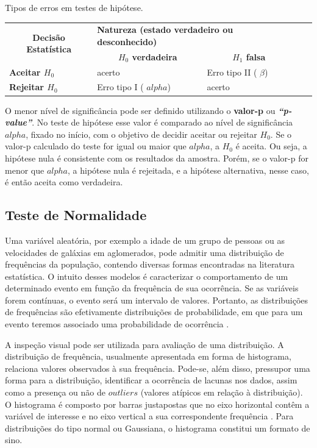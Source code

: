 \begin{quadro}[!htb]
	\centering
	\caption{Tipos de erros em testes de hipótese.\label{qua:hipotese}}
	\begin{tabular}{|l|l|l|ll}
		\cline{1-3}
\multicolumn{1}{|c|}{\multirow{2}{*}{\textbf{Decisão Estatística}}} & \multicolumn{2}{l|}{\textbf{Natureza (estado verdadeiro ou desconhecido)}} &  &  \\ \cline{2-3}
\multicolumn{1}{|c|}{} & \multicolumn{1}{c|}{\textbf{$H_0$ verdadeira}} & \multicolumn{1}{c|}{\textbf{$H_1$ falsa}} &  &  \\ \cline{1-3}
\textbf{Aceitar $H_0$} & acerto & Erro tipo II ( \ensuremath{\beta}) &  &  \\ \cline{1-3}
\textbf{Rejeitar $H_0$} & Erro tipo I ( \ensuremath{alpha}) & acerto &  &  \\ \cline{1-3}
	\end{tabular}
	\textbf{}
\end{quadro}

O menor nível de significância pode ser definido utilizando o \textbf{valor-p} ou \textbf{\textit{“p-value”}}. No teste de hipótese esse valor é comparado ao nível de significância \ensuremath{alpha}, fixado no início, com o objetivo de decidir aceitar ou rejeitar $H_0$. Se o valor-p calculado do teste for igual ou maior que \ensuremath{alpha}, a $H_0$ é aceita. Ou seja, a hipótese nula é consistente com os resultados da amostra. Porém, se o valor-p for menor que \ensuremath{alpha}, a hipótese nula é rejeitada, e a hipótese alternativa, nesse caso, é então aceita como verdadeira.

\subsection{Teste de Normalidade}
Uma variável aleatória, por exemplo a idade de um grupo de pessoas ou as velocidades de galáxias em aglomerados, pode admitir uma distribuição de frequências da população, contendo diversas formas encontradas na literatura estatística. O intuito desses modelos é caracterizar o comportamento de um determinado evento em função da frequência de sua ocorrência. Se as variáveis forem contínuas, o evento será um intervalo de valores. Portanto, as distribuições de frequências são efetivamente distribuições de probabilidade, em que para um evento teremos associado uma probabilidade de ocorrência \cite{leotti2012normalidade}. 

A inspeção visual pode ser utilizada para avaliação de uma distribuição. A distribuição de frequência, usualmente apresentada em forma de histograma, relaciona valores observados à sua frequência. Pode-se, além disso, pressupor uma forma para a distribuição, identificar a ocorrência de lacunas nos dados, assim como a presença ou não de $outliers$ (valores atípicos em relação à distribuição). O histograma é composto por barras justapostas  que no eixo horizontal contêm a variável de interesse  e no eixo vertical a sua correspondente frequência \cite{leotti2012normalidade}. Para distribuições do tipo normal ou Gaussiana, o histograma constitui um formato de sino.

